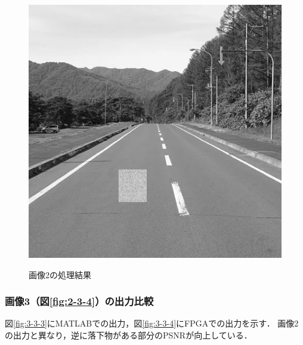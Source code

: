 \documentclass[paper]{ieicej}
\begin{document}
\begin{figure}[tb]
\begin{minipage}[]{0.32\linewidth}
    \label{fig:3-2-3}
  \end{minipage}
  \begin{minipage}[]{0.32\linewidth}
    \centering
    \includegraphics[width=0.9\columnwidth]{figures/Ex_re4.png}
    \label{fig:3-2-4}
  \end{minipage}
  \caption{画像2の処理結果}
  \label{fig:3-2-1}
\end{figure}

\subsubsection{画像3（図\ref{fig:2-3-4}）の出力比較}
図\ref{fig:3-3-3}にMATLABでの出力，図\ref{fig:3-3-4}にFPGAでの出力を示す．
画像2の出力と異なり，逆に落下物がある部分のPSNRが向上している．
\end{document}
